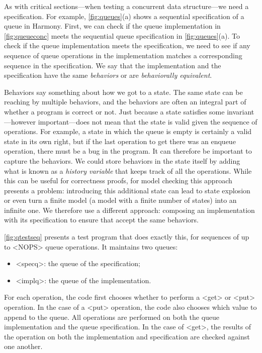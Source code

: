 \documentclass{report}
\begin{document}
As with critical sections---when testing a concurrent data structure---we
need a specification.
For example, \autoref{fig:queues}(a) shows a sequential specification of a
queue in Harmony.
First, we can check if the queue implementation
in \autoref{fig:queueconc} meets the sequential
queue specification in \autoref{fig:queues}(a).
To check if the queue implementation meets the specification,
we need to see if any sequence of queue operations in the
implementation matches a corresponding sequence in the
specification.
We say that the implementation and the specification
have the same \emph{behaviors} or are
\emph{behaviorally equivalent}.

Behaviors say something about how we got to a state.
The same state can be reaching by multiple behaviors, and the behaviors
are often an integral part of whether a program is correct or not.
Just because a state satisfies some invariant---however important---does
not mean that the state is valid given the sequence of operations.
For example, a state in which the queue is empty is certainly a valid state in
its own right, but if the last operation to get there was an enqueue operation,
there must be a bug in the program.
It can therefore be important to capture the behaviors.
We could store behaviors in the state itself by adding what is
known as a \emph{history variable} that keeps track of all the operations.
While this can be useful for correctness proofs, for model checking this approach
presents a problem: introducing this
additional state can lead to state explosion or even turn a finite model
(a model with a finite number of states) into an infinite one.
We therefore use a different approach: composing an implementation with
its specification to ensure that accept the same behaviors.

\autoref{fig:qtestseq} presents a test program that does
exactly this, for sequences of up to <{NOPS}>
queue operations.
It maintains two queues:
\begin{itemize}
\item[] <{specq}>: the queue of the specification;
\item[] <{implq}>: the queue of the implementation.
\end{itemize}
For each operation, the code first chooses whether to
perform a <{get}> or <{put}> operation.
In the case of a <{put}> operation, the code also
chooses which value to append to the queue.
All operations are performed on both the queue implementation
and the queue specification.
In the case of <{get}>, the results of the operation
on both the implementation and specification are checked against one another.
\end{document}
